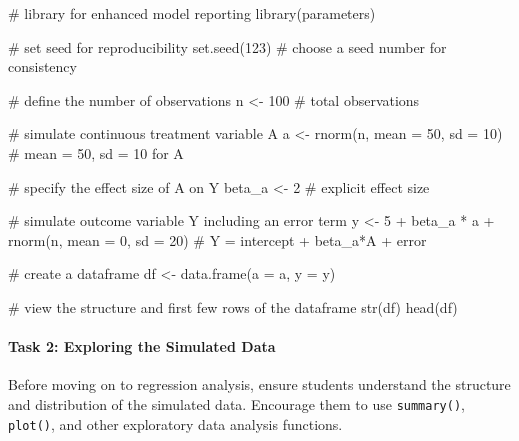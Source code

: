 \documentclass[
  singlecolumn]{article}
\let\oldparagraph\paragraph
\renewcommand{\paragraph}[1]{\oldparagraph{#1}\mbox{}}
\newenvironment{Shaded}{}{}
\newcommand{\AttributeTok}[1]{\textcolor[rgb]{0.84,0.23,0.29}{#1}}
\newcommand{\CommentTok}[1]{\textcolor[rgb]{0.42,0.45,0.49}{#1}}
\newcommand{\DecValTok}[1]{\textcolor[rgb]{0.00,0.36,0.77}{#1}}
\newcommand{\FunctionTok}[1]{\textcolor[rgb]{0.44,0.26,0.76}{#1}}
\newcommand{\NormalTok}[1]{\textcolor[rgb]{0.14,0.16,0.18}{#1}}
\newcommand{\OtherTok}[1]{\textcolor[rgb]{0.44,0.26,0.76}{#1}}
\newcommand{\SpecialCharTok}[1]{\textcolor[rgb]{0.00,0.36,0.77}{#1}}
\theoremstyle{definition}
\theoremstyle{remark}
\begin{document}
\begin{Shaded}
\begin{Highlighting}[]
\CommentTok{\# library for enhanced model reporting}
\FunctionTok{library}\NormalTok{(parameters)}

\CommentTok{\# set seed for reproducibility}
\FunctionTok{set.seed}\NormalTok{(}\DecValTok{123}\NormalTok{) }\CommentTok{\# choose a seed number for consistency}

\CommentTok{\# define the number of observations}
\NormalTok{n }\OtherTok{\textless{}{-}} \DecValTok{100} \CommentTok{\# total observations}

\CommentTok{\# simulate continuous treatment variable A}
\NormalTok{a }\OtherTok{\textless{}{-}} \FunctionTok{rnorm}\NormalTok{(n, }\AttributeTok{mean =} \DecValTok{50}\NormalTok{, }\AttributeTok{sd =} \DecValTok{10}\NormalTok{) }\CommentTok{\# mean = 50, sd = 10 for A}

\CommentTok{\# specify the effect size of A on Y}
\NormalTok{beta\_a }\OtherTok{\textless{}{-}} \DecValTok{2} \CommentTok{\# explicit effect size}

\CommentTok{\# simulate outcome variable Y including an error term}
\NormalTok{y }\OtherTok{\textless{}{-}} \DecValTok{5} \SpecialCharTok{+}\NormalTok{ beta\_a }\SpecialCharTok{*}\NormalTok{ a }\SpecialCharTok{+} \FunctionTok{rnorm}\NormalTok{(n, }\AttributeTok{mean =} \DecValTok{0}\NormalTok{, }\AttributeTok{sd =} \DecValTok{20}\NormalTok{) }\CommentTok{\# Y = intercept + beta\_a*A + error}

\CommentTok{\# create a dataframe}
\NormalTok{df }\OtherTok{\textless{}{-}} \FunctionTok{data.frame}\NormalTok{(}\AttributeTok{a =}\NormalTok{ a, }\AttributeTok{y =}\NormalTok{ y)}

\CommentTok{\# view the structure and first few rows of the dataframe}
\FunctionTok{str}\NormalTok{(df)}
\FunctionTok{head}\NormalTok{(df)}
\end{Highlighting}
\end{Shaded}

\paragraph{\texorpdfstring{\textbf{Task 2: Exploring the Simulated
Data}}{Task 2: Exploring the Simulated Data}}\label{task-2-exploring-the-simulated-data}

Before moving on to regression analysis, ensure students understand the
structure and distribution of the simulated data. Encourage them to use
\texttt{summary()}, \texttt{plot()}, and other exploratory data analysis
functions.
\end{document}
